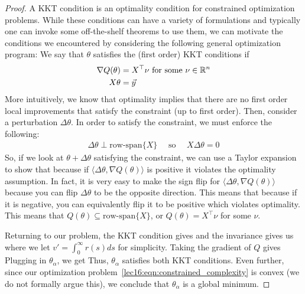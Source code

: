 \begin{proof}
A KKT condition is an optimality condition for constrained optimization problems. While these conditions can have a variety of formulations and typically one can invoke some off-the-shelf theorems to use them, we can motivate the conditions we encountered by considering the following general optimization program:
We say that $\theta$ satisfies the (first order) KKT conditions if
\begin{align}
    \nabla Q(\theta) &= X^\top \nu \text{ for some } \nu \in \mathbb R^n \\
    X\theta &= \vec{y}
\end{align}
More intuitively, we know that optimality implies that there are no first order local improvements that satisfy the constraint (up to first order). Then, consider a perturbation $\Delta \theta$. In order to satisfy the constraint, we must enforce the following:
\begin{align}
\Delta \theta \perp \text{row-span}\{X\}  \quad \text{ so } \quad X \Delta \theta = 0
\end{align}
So, if we look at $\theta + \Delta \theta $ satisfying the constraint, we can use a Taylor expansion to show that
because if $ \langle \Delta \theta, \nabla Q(\theta) \rangle$ is positive it violates the optimality assumption.
In fact, it is very easy to make the sign flip for $ \langle \Delta \theta, \nabla Q(\theta) \rangle$ because you can flip $\Delta \theta$ to be the opposite direction. This means that
because if it is negative, you can equivalently flip it to be positive which violates optimality.
This means that $Q(\theta) \subseteq \text{row-span}\{X\}$, or $Q(\theta) = X^\top \nu$ for some $\nu$.

Returning to our problem, the KKT condition gives
and the invariance gives us
where we let $v' = \int_0^\infty r(s) ds$ for simplicity.
Taking the gradient of $Q$ gives
Plugging in $\theta_\alpha$, we get
Thus, $\theta_\alpha$ satisfies both KKT conditions. Even further, since our optimization problem~\eqref{lec16:eqn:constrained_complexity} is convex (we do not formally argue this), we conclude that $\theta_\alpha$ is a global minimum.
\end{proof}


